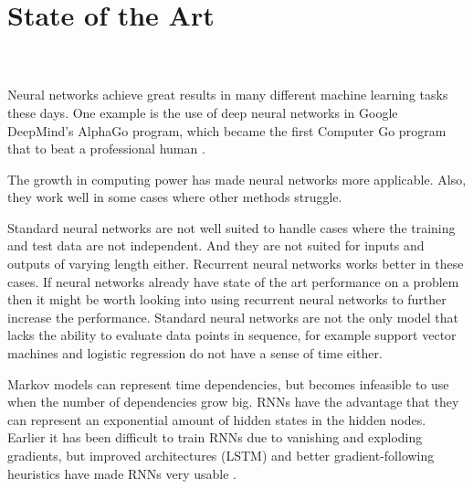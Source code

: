 \chapter{State of the Art}

\\
\\

Neural networks achieve great results in many different machine learning tasks these days. One example is the use of deep neural networks in Google DeepMind's AlphaGo program, which became the first Computer Go program that to beat a professional human \cite{BBC:go-champion}.

The growth in computing power has made neural networks more applicable. Also, they work well in some cases where other methods struggle.

Standard neural networks are not well suited to handle cases where the training and test data are not independent. And they are not suited for inputs and outputs of varying length either. Recurrent neural networks works better in these cases. If neural networks already have state of the art performance on a problem then it might be worth looking into using recurrent neural networks to further increase the performance. Standard neural networks are not the only model that lacks the ability to evaluate data points in sequence, for example support vector machines and logistic regression do not have a sense of time either.

Markov models can represent time dependencies, but becomes infeasible to use when the number of dependencies grow big. RNNs have the advantage that they can represent an exponential amount of hidden states in the hidden nodes.\\

Earlier it has been difficult to train RNNs due to vanishing and exploding gradients, but improved architectures (LSTM) and better gradient-following heuristics have made RNNs very usable \cite{DBLP:journals/corr/Lipton15}.\\


